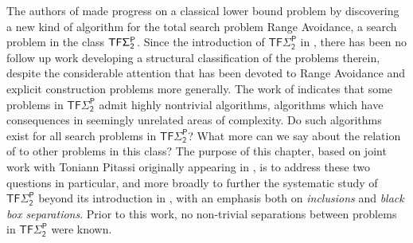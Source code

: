 The authors of \cite{CHR,Li} made progress on a classical lower bound problem by discovering a new kind of algorithm for the total search problem Range Avoidance, a search problem in the class $\cl{TF\Sigma_2^P}$.
Since the introduction of $\mathsf{TF\Sigma_2^P}$ in \cite{KKMP}, there has been no follow up work developing a structural classification of the problems therein, despite the considerable attention that has been devoted to Range Avoidance and explicit construction problems more generally. The work of \cite{CHR,Li} indicates that some problems in $ \mathsf{TF\Sigma_2^P}$ admit highly nontrivial algorithms, algorithms which have consequences in seemingly unrelated areas of complexity. Do such algorithms exist for all search problems in $\mathsf{TF\Sigma_2^P}$? What more can we say about the relation of \avoid to other problems in this class? The purpose of this chapter, based on joint work with Toniann Pitassi originally appearing in \cite{KP24}, is to address these two questions in particular, and more broadly to further the systematic study of $\mathsf{TF\Sigma_2^P}$ beyond its introduction in \cite{KKMP}, with an emphasis both on \emph{inclusions} and \emph{black box separations}. Prior to this work, no non-trivial separations between problems in $\mathsf{TF\Sigma_2^P}$ were known.


